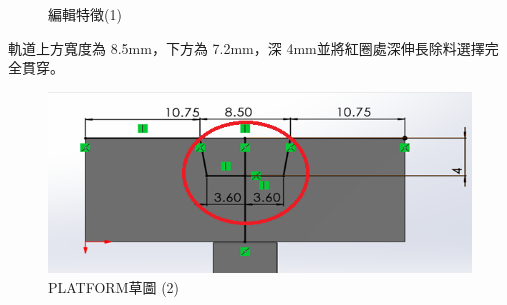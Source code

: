 \begin{figure}[h!]
\begin{minipage}[b]{0.35\textwidth}
        \caption{編輯特徵(1)}
        \label{fig:feature1}
    \end{minipage}
\end{figure}
    
軌道上方寬度為 8.5mm，下方為 7.2mm，深 4mm並將紅圈處深伸長除料選擇完全貫穿。

\begin{figure}[h!]
    \centering
    \begin{minipage}[b]{0.6\textwidth}
        \centering
        \includegraphics[width=\textwidth,height=0.22\textheight]{./../images/6-1-13}
        \caption{PLATFORM草圖 (2)}
        \label{fig:platform}
    \end{minipage}
    \hfill
    \begin{minipage}[b]{0.35\textwidth}
        \centering

\end{minipage}
\end{figure}
